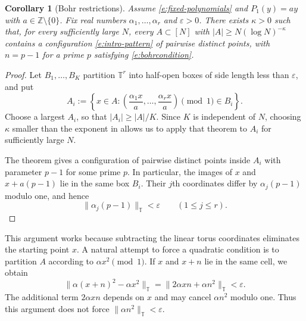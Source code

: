 \documentclass[12pt]{amsart}
\newcommand{\1}{\mathbf 1}
\newtheorem{corollary}[theorem]{Corollary}
\theoremstyle{definition}
\begin{document}
\begin{corollary}[Bohr restrictions]\label{c:bohr}
 Assume \eqref{e:fixed-polynomials} and $P_1(y)=ay$ with
 $a\in\mathbb Z\setminus\{0\}$. Fix real numbers
 $\alpha_1,\ldots,\alpha_r$ and $\varepsilon>0$. There exists
 $\kappa>0$ such that, for every sufficiently large $N$, every
 $A\subset[N]$ with $|A|\geq N(\log N)^{-\kappa}$ contains a configuration \eqref{e:intro-pattern} of pairwise distinct
points, with $n=p-1$ for a prime $p$ satisfying \eqref{e:bohrcondition}.
\end{corollary}

\begin{proof}
Let $B_1,\ldots,B_K$ partition $\mathbb T^r$ into half-open boxes
of side length less than $\varepsilon$, and put
\[
 A_i:=\left\{x\in A:
 \left(\frac{\alpha_1x}{a},\ldots,\frac{\alpha_rx}{a}\right)
 \pmod1\in B_i\right\}.
\]
Choose a largest $A_i$, so that $|A_i|\ge |A|/K$. Since $K$ is
independent of $N$, choosing $\kappa$ smaller than the exponent in
\cite[Theorem~1.2]{KMTT} allows us to apply that theorem to $A_i$
for sufficiently large $N$.

The theorem gives a configuration of pairwise distinct points
inside $A_i$ with parameter $p-1$ for some prime $p$.
In particular, the images of $x$ and $x+a(p-1)$ lie in the same box
$B_i$. Their $j$th coordinates differ by $\alpha_j(p-1)$ modulo one,
and hence
\[
 \|\alpha_j(p-1)\|_{\mathbb T}<\varepsilon
 \qquad(1\le j\le r).
\]
\end{proof}

This argument works because subtracting the linear torus
coordinates eliminates the starting point $x$. A natural attempt to
force a quadratic condition is to partition $A$ according to
$\alpha x^2\pmod1$. If $x$ and $x+n$ lie in the same cell, we obtain
\[
 \|\alpha(x+n)^2-\alpha x^2\|_{\mathbb T}
 =\|2\alpha xn+\alpha n^2\|_{\mathbb T}<\varepsilon.
\]
The additional term $2\alpha xn$ depends on $x$ and may cancel
$\alpha n^2$ modulo one. Thus this argument does not force
$\|\alpha n^2\|_{\mathbb T}<\varepsilon$.

\bigskip
\end{document}
